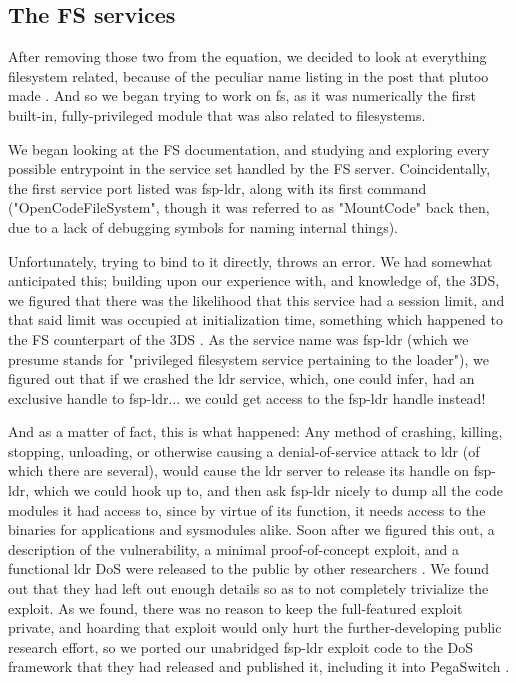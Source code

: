 \documentclass[journal]{IEEEtran}
\begin{document}
\subsection{The FS services}

After removing those two from the equation, we decided to look at everything
filesystem related, because of the peculiar name listing in the post that plutoo made
\cite{modules_dump}. And so we began trying to work on fs, as it was
numerically the first built-in, fully-privileged module that was also related to filesystems.

We began looking at the FS documentation, and studying and exploring every possible entrypoint in
the service set handled by the FS server. Coincidentally, the first service port listed was
fsp-ldr, along with its first command ("OpenCodeFileSystem", though it was referred to as
"MountCode" back then, due to a lack of debugging symbols for naming internal things).

Unfortunately, trying to bind to it directly, throws an error. We had somewhat anticipated this;
building upon our experience with, and knowledge of, the 3DS, we figured that there was the
likelihood that this service had a session limit, and that said limit was occupied at
initialization time, something which happened to the FS counterpart of the 3DS
\cite{3ds_single_session}. As the service name was fsp-ldr (which we presume stands for "privileged
filesystem service pertaining to the loader"), we figured out that if we crashed the ldr service,
which, one could infer, had an exclusive handle to fsp-ldr... we could get access to the fsp-ldr
handle instead!

And as a matter of fact, this is what happened: Any method of crashing, killing, stopping,
unloading, or otherwise causing a denial-of-service attack to ldr (of which there are several),
would cause the ldr server to release its handle on fsp-ldr, which we could hook up to, and then
ask fsp-ldr nicely to dump all the code modules it had access to, since by virtue of its function,
it needs access to the binaries for applications and sysmodules alike. Soon after we figured this
out, a description of the vulnerability, a minimal proof-of-concept exploit, and a functional ldr
DoS were released to the public by other researchers \cite{switch}. We found out that they had left
out enough details so as to not completely trivialize the exploit. As we found, there was no
reason to keep the full-featured exploit private, and hoarding that exploit would only hurt the
further-developing public research effort, so we ported our unabridged fsp-ldr exploit code to the
DoS framework that they had released and published it, including it into PegaSwitch
\cite{dump_modules_gov}.
\end{document}
